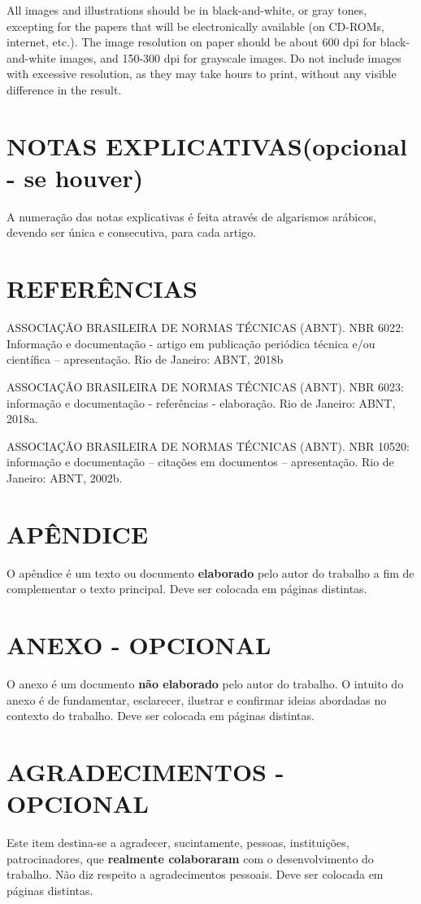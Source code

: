 \documentclass[12pt]{article}
\begin{document}
All images and illustrations should be in black-and-white, or gray tones,
excepting for the papers that will be electronically available (on CD-ROMs, internet, etc.). The image resolution on paper should be about 600 dpi for black-and-white images, and 150-300 dpi for grayscale images.  Do not include images with excessive resolution, as they may take hours to print, without any visible difference in the result. 

\section*{NOTAS EXPLICATIVAS(opcional - se houver)}
A numeração das notas explicativas é feita através de algarismos arábicos, devendo ser única e consecutiva, para cada artigo.

\section*{REFERÊNCIAS}
ASSOCIAÇÃO BRASILEIRA DE NORMAS TÉCNICAS (ABNT). NBR 6022: Informação e documentação - artigo em publicação periódica técnica e/ou científica – apresentação. Rio de Janeiro: ABNT, 2018b

ASSOCIAÇÃO BRASILEIRA DE NORMAS TÉCNICAS (ABNT). NBR 6023: informação e documentação - referências - elaboração. Rio de Janeiro: ABNT, 2018a.

ASSOCIAÇÃO BRASILEIRA DE NORMAS TÉCNICAS (ABNT). NBR 10520: informação e documentação – citações em documentos – apresentação. Rio de Janeiro: ABNT, 2002b.


\section*{APÊNDICE}
O apêndice é um texto ou documento \textbf{elaborado} pelo autor do trabalho a fim de complementar o texto principal. Deve ser colocada em páginas distintas.

\section*{ANEXO - OPCIONAL}
O anexo é um documento \textbf{não elaborado} pelo autor do trabalho. O intuito do anexo é de fundamentar, esclarecer, ilustrar e confirmar ideias abordadas no contexto do trabalho. Deve ser colocada em páginas distintas.


\section*{AGRADECIMENTOS - OPCIONAL}
Este item destina-se a agradecer, sucintamente, pessoas, instituições, patrocinadores, que \textbf{realmente colaboraram} com o desenvolvimento do trabalho. Não diz respeito a agradecimentos pessoais. Deve ser colocada em páginas distintas.


\newpage

%

\end{document}
